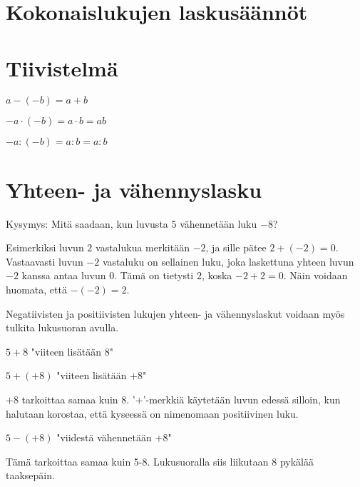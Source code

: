 \section{Kokonaislukujen laskusäännöt}

\section{Tiivistelmä}

    $a-(-b)=a+b$
    
    $-a\cdot (-b)=a\cdot b=ab$
    
    $-a:(-b)=a: b=a:b$

\section{Yhteen- ja vähennyslasku}

    Kysymys: Mitä saadaan, kun luvusta $5$ vähennetään luku $-8$?
    
    
    Esimerkiksi luvun $2$ vastalukua merkitään $-2$, ja sille pätee $2+(-2)=0$.
    Vastaavasti luvun $-2$ vastaluku on sellainen luku, joka laskettuna yhteen
    luvun $-2$ kanssa antaa luvun $0$. Tämä on tietysti $2$, koska $-2+2=0$.
    Näin voidaan huomata, että $-(-2)=2$.
    
    Negatiivisten ja positiivisten lukujen yhteen- ja vähennyslaskut voidaan myös
    tulkita lukusuoran avulla.
    
    
    $5+8$ "viiteen lisätään $8$"
    
    
    $5+(+8)$ "viiteen lisätään $+8$"
    
    $+8$ tarkoittaa samaa kuin $8$. '$+$'-merkkiä käytetään luvun edessä silloin,
    kun halutaan korostaa, että kyseessä on nimenomaan positiivinen luku.
    
    
    $5-(+8)$ "viidestä vähennetään $+8$"
    
    Tämä tarkoittaa samaa kuin 5-8. Lukusuoralla siis liikutaan 8 pykälää taaksepäin.
    
    
